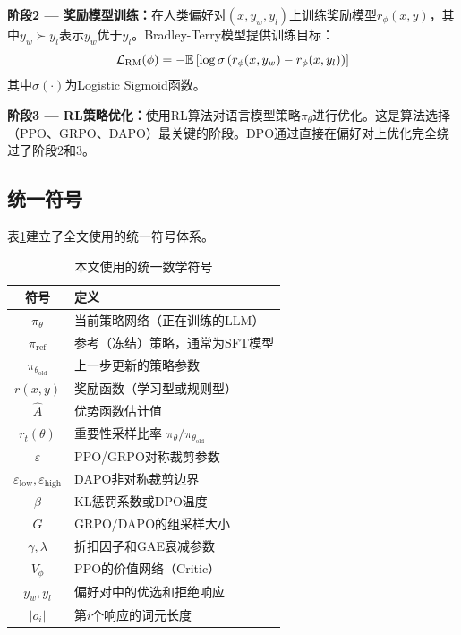 \textbf{阶段2 --- 奖励模型训练：}在人类偏好对$(x, y_w, y_l)$上训练奖励模型$r_\phi(x, y)$，其中$y_w \succ y_l$表示$y_w$优于$y_l$。Bradley-Terry模型提供训练目标：
\begin{equation}
\mathcal{L}_{\text{RM}}(\phi) = -\mathbb{E}\left[\log \sigma\left(r_\phi(x, y_w) - r_\phi(x, y_l)\right)\right]
\end{equation}
其中$\sigma(\cdot)$为Logistic Sigmoid函数。

\textbf{阶段3 --- RL策略优化：}使用RL算法对语言模型策略$\pi_\theta$进行优化。这是算法选择（PPO、GRPO、DAPO）最关键的阶段。DPO通过直接在偏好对上优化完全绕过了阶段2和3。

\subsection{统一符号}

表\ref{tab:notation}建立了全文使用的统一符号体系。

\begin{table}[ht]
\centering
\caption{本文使用的统一数学符号}
\label{tab:notation}
\begin{tabular}{cl}
\toprule
\textbf{符号} & \textbf{定义} \\
\midrule
$\pi_\theta$ & 当前策略网络（正在训练的LLM） \\
$\pi_{\text{ref}}$ & 参考（冻结）策略，通常为SFT模型 \\
$\pi_{\theta_{\text{old}}}$ & 上一步更新的策略参数 \\
$r(x,y)$ & 奖励函数（学习型或规则型） \\
$\hat{A}$ & 优势函数估计值 \\
$r_t(\theta)$ & 重要性采样比率 $\pi_\theta/\pi_{\theta_{\text{old}}}$ \\
$\varepsilon$ & PPO/GRPO对称裁剪参数 \\
$\varepsilon_{\text{low}}, \varepsilon_{\text{high}}$ & DAPO非对称裁剪边界 \\
$\beta$ & KL惩罚系数或DPO温度 \\
$G$ & GRPO/DAPO的组采样大小 \\
$\gamma, \lambda$ & 折扣因子和GAE衰减参数 \\
$V_\phi$ & PPO的价值网络（Critic） \\
$y_w, y_l$ & 偏好对中的优选和拒绝响应 \\
$|o_i|$ & 第$i$个响应的词元长度 \\
\bottomrule
\end{tabular}
\end{table}
